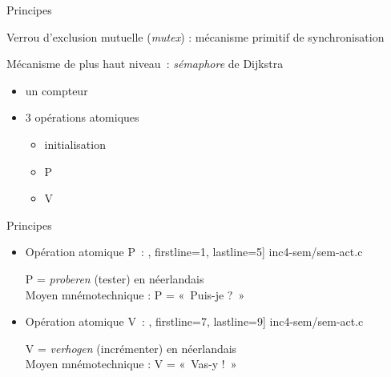 %
%

\def\inc{inc4-sem}




\begin {frame} {Principes}

    Verrou d'exclusion mutuelle (\emph {mutex\/}) :
    mécanisme primitif de synchronisation

    \vspace* {3mm}

    Mécanisme de plus haut niveau~: 
    \emph {sémaphore} de Dijkstra

    \begin {itemize}
	\item un compteur
	\item 3 opérations atomiques
	    \begin {itemize}
		\item initialisation
		\item P
		\item V
	    \end {itemize}
    \end {itemize}

\end {frame}

\begin {frame} {Principes}

    \begin {itemize}
	\item Opération atomique P~:
	    \scriptsize\lstmonstyle, firstline=1, lastline=5] {\inc/sem-act.c}

	    P = \emph {proberen} (tester) en néerlandais \\
	    Moyen mnémotechnique : P = «~Puis-je ?~»

	\item Opération atomique V~:
	    \scriptsize\lstmonstyle, firstline=7, lastline=9] {\inc/sem-act.c}

	    V = \emph {verhogen} (incrémenter) en néerlandais \\
	    Moyen mnémotechnique : V = «~Vas-y !~»
    \end {itemize}

\end {frame}

